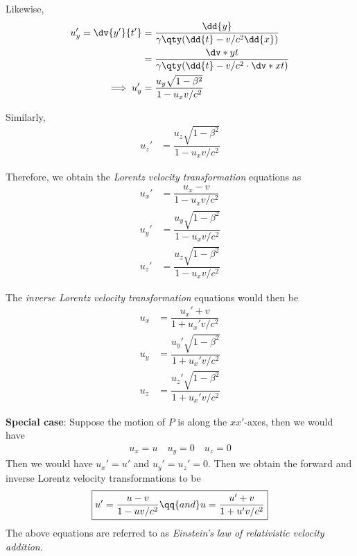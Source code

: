 		Likewise,
		\begin{align*}
			u_y'=\dv{y'}{t'}&=\dfrac{\dd{y}}{\gamma\qty(\dd{t}-{v}/{c^2}\dd{x})} \\
				&=\dfrac{\dv*{y}{t}}{\gamma\qty(\dd{t}-v/c^2\cdot\dv*{x}{t})} \\
			\implies u_y'&=\dfrac{u_y\sqrt{1-\beta^2}}{1-u_xv/c^2}
		\end{align*}
		
		Similarly,
		\begin{align*}
			u_z'&=\dfrac{u_z\sqrt{1-\beta^2}}{1-u_xv/c^2}
		\end{align*}
		
		Therefore, we obtain the \emph{Lorentz velocity transformation} equations as
		\begin{equation*}
			\boxed{
				\begin{aligned}
					u_x'&=\dfrac{u_x-v}{1-u_xv/c^2} \\
					u_y'&=\dfrac{u_y\sqrt{1-\beta^2}}{1-u_xv/c^2} \\
					u_z'&=\dfrac{u_z\sqrt{1-\beta^2}}{1-u_xv/c^2}
				\end{aligned}
			}
		\end{equation*}
		
		The \emph{inverse Lorentz velocity transformation} equations would then be
		\begin{equation*}
			\boxed{
				\begin{aligned}
					u_x&=\dfrac{u_x'+v}{1+u_x'v/c^2} \\
					u_y&=\dfrac{u_y'\sqrt{1-\beta^2}}{1+u_x'v/c^2} \\
					u_z&=\dfrac{u_z'\sqrt{1-\beta^2}}{1+u_x'v/c^2}
				\end{aligned}
			}
		\end{equation*}
		
		\textbf{Special case}: Suppose the motion of $P$ is along the $xx'$-axes, then we would have
		\begin{align*}
			u_x=u\quad u_y=0\quad u_z=0
		\end{align*}
		Then we would have $u_x'=u'$ and $u_y'=u_z'=0$. Then we obtain the forward and inverse Lorentz velocity transformations to be
		\begin{equation*}
			\boxed{
				u'=\dfrac{u-v}{1-uv/c^2}\qq{and}u=\dfrac{u'+v}{1+u'v/c^2}
			}
		\end{equation*}
		The above equations are referred to as \emph{Einstein's law of relativistic velocity addition}.
		
